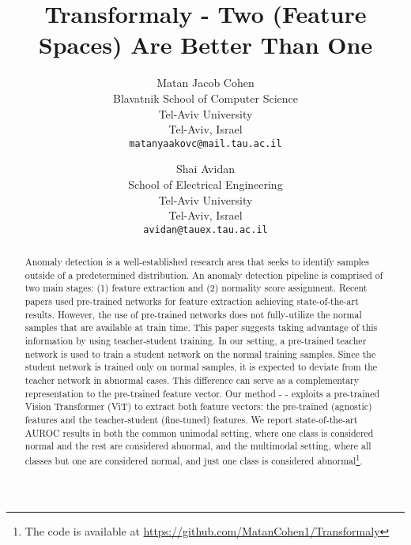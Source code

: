\documentclass[10pt,twocolumn,letterpaper]{article}
\begin{document}
\title{Transformaly - Two (Feature Spaces) Are Better Than One}

\author{Matan Jacob Cohen\\
Blavatnik School of Computer Science\\
Tel-Aviv University\\
Tel-Aviv, Israel\\
{\tt\small matanyaakovc@mail.tau.ac.il}


\and
Shai Avidan\\
School of Electrical Engineering\\
Tel-Aviv University\\
Tel-Aviv, Israel\\
{\tt\small avidan@tauex.tau.ac.il}
}
\maketitle

\begin{abstract}
    Anomaly detection is a well-established research area that seeks to identify samples outside of a predetermined distribution. An anomaly detection pipeline is comprised of two main stages: (1) feature extraction and (2) normality score assignment. Recent papers used pre-trained networks for feature extraction achieving state-of-the-art results. However, the use of pre-trained networks does not fully-utilize the normal samples that are available at train time. This paper suggests taking advantage of this information by using teacher-student training. In our setting, a pre-trained teacher network is used to train a student network on the normal training samples. Since the student network is trained only on normal samples, it is expected to deviate from the teacher network in abnormal cases. This difference can serve as a complementary representation to the pre-trained feature vector. Our method -  - exploits a pre-trained Vision Transformer (ViT) to extract both feature vectors: the pre-trained (agnostic) features and the teacher-student (fine-tuned) features. We report state-of-the-art AUROC results in both the common unimodal setting, where one class is considered normal and the rest are considered abnormal, and the multimodal setting, where all classes but one are considered normal, and just one class is considered abnormal\footnote{The code is available at \url{https://github.com/MatanCohen1/Transformaly}}.


\end{abstract}
\end{document}
